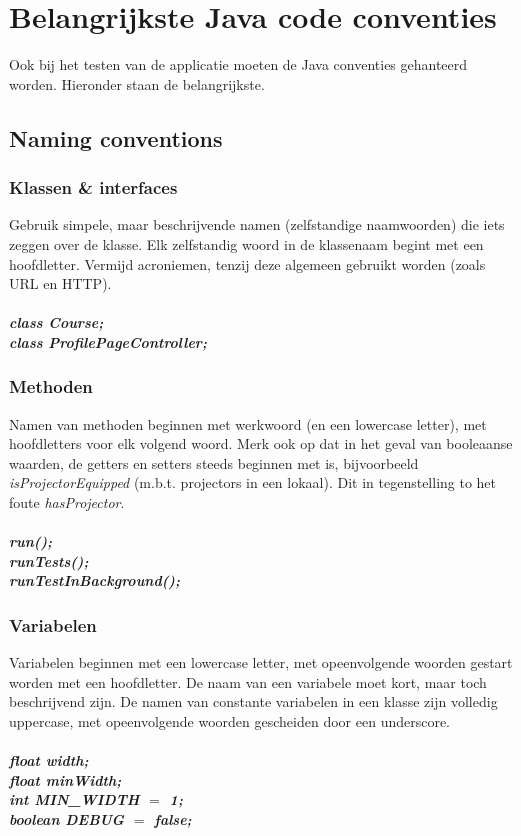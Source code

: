 \newpage
\section{Belangrijkste Java code conventies}
Ook bij het testen van de applicatie moeten de Java conventies gehanteerd worden. 
Hieronder staan de belangrijkste.
\subsection{Naming conventions}
	\subsubsection{Klassen \& interfaces}
		Gebruik simpele, maar beschrijvende namen (zelfstandige naamwoorden) die iets zeggen over de klasse. Elk zelfstandig woord in de klassenaam begint met een hoofdletter. Vermijd acroniemen, tenzij deze algemeen gebruikt worden (zoals URL en HTTP).
		\\ \\
		\emph{\textbf{class Course;}} \\
		\emph{\textbf{class ProfilePageController;}}
		
	\subsubsection{Methoden}
		Namen van methoden beginnen met werkwoord (en een lowercase letter), met hoofdletters voor elk volgend woord.
		Merk ook op dat in het geval van booleaanse waarden, de getters en setters steeds beginnen met is, bijvoorbeeld \emph{isProjectorEquipped} (m.b.t. projectors in een lokaal). 
		Dit in tegenstelling to het foute \emph{hasProjector}.
		\\ \\
		\emph{\textbf{run();}} \\
		\emph{\textbf{runTests();}} \\
		\emph{\textbf{runTestInBackground();}}
		
	\subsubsection{Variabelen}
		Variabelen beginnen met een lowercase letter, met opeenvolgende woorden gestart worden met een hoofdletter. 
		De naam van een variabele moet kort, maar toch beschrijvend zijn. 
		De namen van constante variabelen in een klasse zijn volledig uppercase, met opeenvolgende woorden gescheiden door een underscore.
		\\ \\		
		\emph{\textbf{float width;}} \\
		\emph{\textbf{float minWidth;}} \\
		\emph{\textbf{int MIN\_WIDTH $=$ 1;}} \\
		\emph{\textbf{boolean DEBUG $=$ false;}} \\
		
